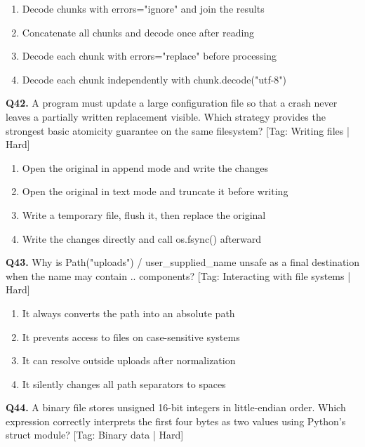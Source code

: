 \begin{enumerate}[label=(\alph*),topsep=2pt,itemsep=1pt,partopsep=0pt,parsep=0pt]
    \item {Decode chunks with errors="ignore" and join the results}
    \item {Concatenate all chunks and decode once after reading}
    \item {Decode each chunk with errors="replace" before processing}
    \item {Decode each chunk independently with chunk.decode("utf-8")}
\end{enumerate}
\vspace{2mm}
\noindent\textbf{Q42.} A program must update a large configuration file so that a crash never leaves a partially written replacement visible. Which strategy provides the strongest basic atomicity guarantee on the same filesystem? \hfill [Tag: Writing files | Hard]
\begin{enumerate}[label=(\alph*),topsep=2pt,itemsep=1pt,partopsep=0pt,parsep=0pt]
    \item {Open the original in append mode and write the changes}
    \item {Open the original in text mode and truncate it before writing}
    \item {Write a temporary file, flush it, then replace the original}
    \item {Write the changes directly and call os.fsync() afterward}
\end{enumerate}
\vspace{2mm}
\noindent\textbf{Q43.} Why is Path("uploads") / user\_supplied\_name unsafe as a final destination when the name may contain .. components? \hfill [Tag: Interacting with file systems | Hard]
\begin{enumerate}[label=(\alph*),topsep=2pt,itemsep=1pt,partopsep=0pt,parsep=0pt]
    \item {It always converts the path into an absolute path}
    \item {It prevents access to files on case-sensitive systems}
    \item {It can resolve outside uploads after normalization}
    \item {It silently changes all path separators to spaces}
\end{enumerate}
\vspace{2mm}
\noindent\textbf{Q44.} A binary file stores unsigned 16-bit integers in little-endian order. Which expression correctly interprets the first four bytes as two values using Python's struct module? \hfill [Tag: Binary data | Hard]
